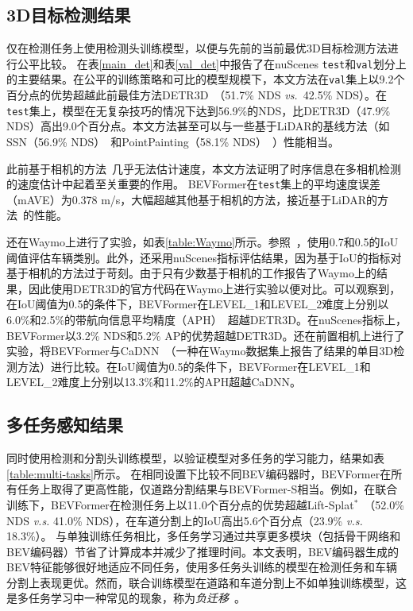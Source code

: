 \documentclass{article}
\begin{document}
\subsection{3D目标检测结果}

仅在检测任务上使用检测头训练模型，以便与先前的当前最优3D目标检测方法进行公平比较。
在表\ref{main_det}和表\ref{val_det}中报告了在nuScenes \texttt{test}和\texttt{val}划分上的主要结果。在公平的训练策略和可比的模型规模下，本文方法在\texttt{val}集上以9.2个百分点的优势超越此前最佳方法DETR3D~\cite{wang2022detr3d}（51.7\% NDS \emph{vs.~}42.5\% NDS）。在\texttt{test}集上，模型在无复杂技巧的情况下达到56.9\%的NDS，比DETR3D（47.9\% NDS）高出9.0个百分点。本文方法甚至可以与一些基于LiDAR的基线方法（如SSN（56.9\% NDS）~\cite{zhu2020ssn}和PointPainting（58.1\% NDS）~\cite{vora2020pointpainting}）性能相当。

此前基于相机的方法~\cite{wang2022detr3d,park2021pseudo,wang2021fcos3d}几乎无法估计速度，本文方法证明了时序信息在多相机检测的速度估计中起着至关重要的作用。
BEVFormer在\texttt{test}集上的平均速度误差（mAVE）为0.378 m/s，大幅超越其他基于相机的方法，接近基于LiDAR的方法~\cite{vora2020pointpainting}的性能。

还在Waymo上进行了实验，如表\ref{table:Waymo}所示。参照~\cite{reading2021categorical}，使用0.7和0.5的IoU阈值评估车辆类别。此外，还采用nuScenes指标评估结果，因为基于IoU的指标对基于相机的方法过于苛刻。由于只有少数基于相机的工作报告了Waymo上的结果，因此使用DETR3D的官方代码在Waymo上进行实验以便对比。可以观察到，在IoU阈值为0.5的条件下，BEVFormer在LEVEL\_1和LEVEL\_2难度上分别以6.0\%和2.5\%的带航向信息平均精度（APH）~\cite{sun2020scalability}超越DETR3D。在nuScenes指标上，BEVFormer以3.2\% NDS和5.2\% AP的优势超越DETR3D。还在前置相机上进行了实验，将BEVFormer与CaDNN~\cite{reading2021categorical}（一种在Waymo数据集上报告了结果的单目3D检测方法）进行比较。在IoU阈值为0.5的条件下，BEVFormer在LEVEL\_1和LEVEL\_2难度上分别以13.3\%和11.2\%的APH超越CaDNN。 








\subsection{多任务感知结果}
同时使用检测和分割头训练模型，以验证模型对多任务的学习能力，结果如表\ref{table:multi-tasks}所示。
在相同设置下比较不同BEV编码器时，BEVFormer在所有任务上取得了更高性能，仅道路分割结果与BEVFormer-S相当。例如，在联合训练下，BEVFormer在检测任务上以11.0个百分点的优势超越Lift-Splat$^*$~\cite{philion2020lift}（52.0\% NDS \emph{v.s.} 41.0\% NDS），在车道分割上的IoU高出5.6个百分点（23.9\% \emph{v.s.} 18.3\%）。
与单独训练任务相比，多任务学习通过共享更多模块（包括骨干网络和BEV编码器）节省了计算成本并减少了推理时间。本文表明，BEV编码器生成的BEV特征能够很好地适应不同任务，使用多任务头训练的模型在检测任务和车辆分割上表现更优。然而，联合训练模型在道路和车道分割上不如单独训练模型，这是多任务学习中一种常见的现象，称为\textit{负迁移}~\cite{crawshaw2020multi,fifty2021efficiently}。
\end{document}
